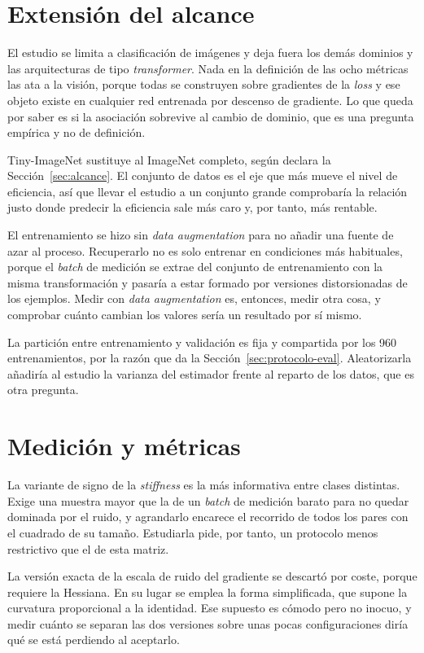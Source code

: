 \section{Extensión del alcance}
\label{sec:futuro-alcance}

El estudio se limita a clasificación de imágenes y deja fuera los demás dominios y las arquitecturas de tipo \emph{transformer}. Nada en la definición de las ocho métricas las ata a la visión, porque todas se construyen sobre gradientes de la \emph{loss} y ese objeto existe en cualquier red entrenada por descenso de gradiente. Lo que queda por saber es si la asociación sobrevive al cambio de dominio, que es una pregunta empírica y no de definición.

Tiny-ImageNet sustituye al ImageNet completo, según declara la Sección~\ref{sec:alcance}. El conjunto de datos es el eje que más mueve el nivel de eficiencia, así que llevar el estudio a un conjunto grande comprobaría la relación justo donde predecir la eficiencia sale más caro y, por tanto, más rentable.

El entrenamiento se hizo sin \emph{data augmentation} para no añadir una fuente de azar al proceso. Recuperarlo no es solo entrenar en condiciones más habituales, porque el \emph{batch} de medición se extrae del conjunto de entrenamiento con la misma transformación y pasaría a estar formado por versiones distorsionadas de los ejemplos. Medir con \emph{data augmentation} es, entonces, medir otra cosa, y comprobar cuánto cambian los valores sería un resultado por sí mismo.

La partición entre entrenamiento y validación es fija y compartida por los 960 entrenamientos, por la razón que da la Sección~\ref{sec:protocolo-eval}. Aleatorizarla añadiría al estudio la varianza del estimador frente al reparto de los datos, que es otra pregunta.

\section{Medición y métricas}
\label{sec:futuro-medicion}

La variante de signo de la \emph{stiffness} es la más informativa entre clases distintas. Exige una muestra mayor que la de un \emph{batch} de medición barato para no quedar dominada por el ruido, y agrandarlo encarece el recorrido de todos los pares con el cuadrado de su tamaño. Estudiarla pide, por tanto, un protocolo menos restrictivo que el de esta matriz.

La versión exacta de la escala de ruido del gradiente se descartó por coste, porque requiere la Hessiana. En su lugar se emplea la forma simplificada, que supone la curvatura proporcional a la identidad. Ese supuesto es cómodo pero no inocuo, y medir cuánto se separan las dos versiones sobre unas pocas configuraciones diría qué se está perdiendo al aceptarlo.

